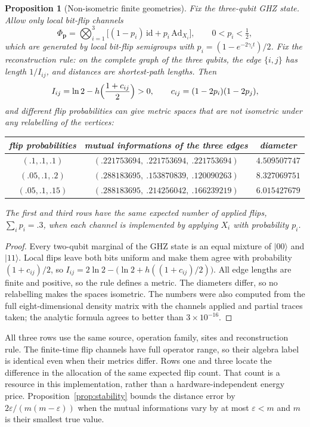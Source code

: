 \documentclass[12pt,a4paper]{article}
\newtheorem{proposition}[theorem]{Proposition}
\begin{document}
\begin{proposition}[Non-isometric finite geometries]
\label{prop:ghz}
Fix the three-qubit GHZ state. Allow only local bit-flip channels
\[
\Phi_{\mathbf p}=\bigotimes_{i=1}^3\bigl[(1-p_i)\,\mathrm{id}+p_i\,\mathrm{Ad}_{X_i}\bigr],\qquad 0<p_i<\tfrac12,
\]
which are generated by local bit-flip semigroups with $p_i=(1-e^{-2\gamma_it})/2$. Fix the reconstruction rule: on the complete graph of the three qubits, the edge $\{i,j\}$ has length $1/I_{ij}$, and distances are shortest-path lengths. Then
\[
I_{ij}=\ln2-h\Bigl(\frac{1+c_{ij}}2\Bigr)>0,\qquad c_{ij}=(1-2p_i)(1-2p_j),
\]
and different flip probabilities can give metric spaces that are not isometric under any relabelling of the vertices:
\begin{center}
\begin{tabular}{ccc}
\toprule
flip probabilities & mutual informations of the three edges & diameter\\
\midrule
$(.1,.1,.1)$ & $(.221753694,\ .221753694,\ .221753694)$ & $4.509507747$\\
$(.05,.1,.2)$ & $(.288183695,\ .153870839,\ .120090263)$ & $8.327069751$\\
$(.05,.1,.15)$ & $(.288183695,\ .214256042,\ .166239219)$ & $6.015427679$\\
\bottomrule
\end{tabular}
\end{center}
The first and third rows have the same expected number of applied flips, $\sum_ip_i=.3$, when each channel is implemented by applying $X_i$ with probability $p_i$.
\end{proposition}

\begin{proof}
Every two-qubit marginal of the GHZ state is an equal mixture of $|00\rangle$ and $|11\rangle$. Local flips leave both bits uniform and make them agree with probability $(1+c_{ij})/2$, so $I_{ij}=2\ln2-\bigl(\ln2+h((1+c_{ij})/2)\bigr)$. All edge lengths are finite and positive, so the rule defines a metric. The diameters differ, so no relabelling makes the spaces isometric. The numbers were also computed from the full eight-dimensional density matrix with the channels applied and partial traces taken; the analytic formula agrees to better than $3\times10^{-16}$.
\end{proof}

All three rows use the same source, operation family, sites and
reconstruction rule. The finite-time flip channels have full
operator range, so their algebra label is identical even when their
metrics differ. Rows one and three locate the difference in the
allocation of the same expected flip count. That count is a resource
in this implementation, rather than a hardware-independent energy
price. Proposition~\ref{prop:stability} bounds the distance error by
$2\varepsilon/(m(m-\varepsilon))$ when the mutual informations vary
by at most $\varepsilon<m$ and $m$ is their smallest true value.
\end{document}
